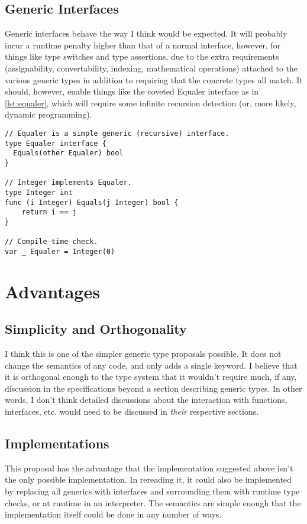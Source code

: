 \documentclass[10pt,a4paper]{article}
\newcommand{\Listing}[1]{\autoref{lst:#1}}
\begin{document}
\subsection{Generic Interfaces}
Generic interfaces behave the way I think would be expected.  It will probably incur a runtime penalty higher than that of a normal interface, however, for things like type switches and type assertions, due to the extra requirements (assignability, convertability, indexing, mathematical operations) attached to the various generic types in addition to requiring that the concrete types all match.  It should, however, enable things like the coveted Equaler interface as in \Listing{equaler}, which will require some infinite recursion detection (or, more likely, dynamic programming).

\begin{lstlisting}[float=htbp,caption={Equaler interface.},label=lst:equaler]
// Equaler is a simple generic (recursive) interface.
type Equaler interface {
  Equals(other Equaler) bool
}

// Integer implements Equaler.
type Integer int
func (i Integer) Equals(j Integer) bool {
	return i == j
}

// Compile-time check.
var _ Equaler = Integer(0)
\end{lstlisting}

\section{Advantages}
\subsection{Simplicity and Orthogonality}
I think this is one of the simpler generic type proposals possible.  It does not change the semantics of any code, and only adds a single keyword.  I believe that it is orthogonal enough to the type system that it wouldn't require much, if any, discussion in the specifications beyond a section describing generic types.  In other words, I don't think detailed discussions about the interaction with functions, interfaces, etc. would need to be discussed in \textit{their} respective sections.

\subsection{Implementations}
This proposal has the advantage that the implementation suggested above isn't the only possible implementation.  In rereading it, it could also be implemented by replacing all generics with interfaces and surrounding them with runtime type checks, or at runtime in an interpreter.  The semantics are simple enough that the implementation itself could be done in any number of ways.
\end{document}
